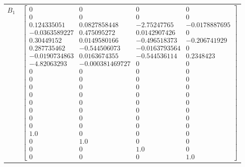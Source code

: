 \begin{tabular}{cl}
 $B_{1}$  & $\left[\begin{matrix}0 & 0 & 0 & 0\\0 & 0 & 0 & 0\\0.124335051 & 0.0827858448 & -2.75247765 & -0.0178887695\\-0.0363589227 & 0.475095272 & 0.0142907426 & 0\\0.30449152 & 0.0149580166 & -0.496518373 & -0.206741929\\0.287735462 & -0.544506073 & -0.0163793564 & 0\\-0.0190734863 & 0.0163674355 & -0.544536114 & 0.2348423\\-4.82063293 & -0.000381469727 & 0 & 0\\0 & 0 & 0 & 0\\0 & 0 & 0 & 0\\0 & 0 & 0 & 0\\0 & 0 & 0 & 0\\0 & 0 & 0 & 0\\0 & 0 & 0 & 0\\0 & 0 & 0 & 0\\0 & 0 & 0 & 0\\1.0 & 0 & 0 & 0\\0 & 1.0 & 0 & 0\\0 & 0 & 1.0 & 0\\0 & 0 & 0 & 1.0\end{matrix}\right]$                                                                                                                                                                                                                                                                                                                                                                                                                                                                                                                                                                                                                                                                                                                                                                                                                                                                                                                                                                                                                                                                                                                                                                                                                                                                                                                                                                                                                                                                                                                                                                                                                                                                                             \\

\end{tabular}
